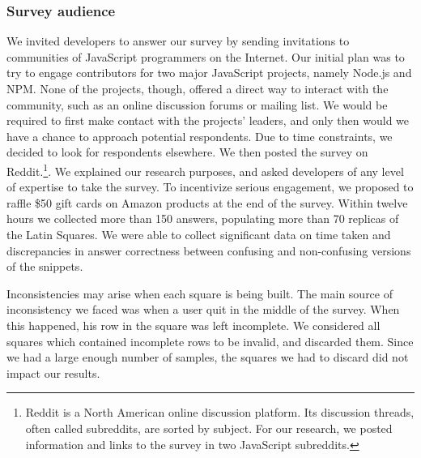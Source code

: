 \subsubsection{Survey audience} 
{\color{blue}We invited developers to answer our survey by sending invitations to communities of JavaScript programmers on the Internet. Our initial plan was to try to engage contributors for two major JavaScript projects, namely Node.js and NPM. None of the projects, though, offered a direct way to interact with the community, such as an online discussion forums or mailing list. We would be required to first make contact with the projects' leaders, and only then would we have a chance to approach potential respondents. Due to time constraints, we decided to look for respondents elsewhere.}
We then posted the survey on Reddit.\footnote{Reddit is a North American online discussion platform. Its discussion threads, often called subreddits, are sorted by subject. For our research, we posted information and links to the survey in two JavaScript subreddits.}. We explained our research purposes, and asked developers of any level of expertise to take the survey. To incentivize serious engagement, we proposed to raffle \$50 gift cards on Amazon products at the end of the survey. Within twelve hours we collected more than 150 answers, populating more than 70 replicas of the Latin Squares. We were able to collect significant data on time taken and discrepancies in answer correctness between confusing and non-confusing versions of the snippets. 
    

Inconsistencies may arise when each square is being built. The main source of inconsistency we faced was when a user quit in the middle of the survey. When this happened, his row in the square was left incomplete. We considered all squares which contained incomplete rows to be invalid, and discarded them. Since we had a large enough number of samples, the squares we had to discard did not impact our results.
    
    

